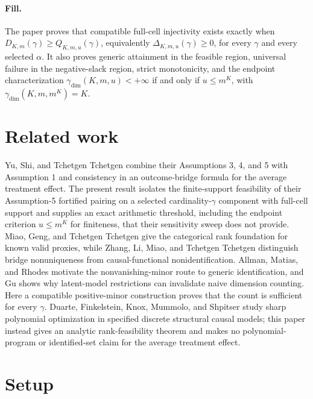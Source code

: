 \documentclass{article}
\begin{document}
\paragraph{Fill.} The paper proves that compatible full-cell injectivity exists exactly when \(D_{K,m}(\gamma)\ge Q_{K,m,u}(\gamma)\), equivalently \(\Delta_{K,m,u}(\gamma)\ge0\), for every \(\gamma\) and every selected \(\alpha\). It also proves generic attainment in the feasible region, universal failure in the negative-slack region, strict monotonicity, and the endpoint characterization \(\gamma_{\mathrm{dim}}(K,m,u)<+\infty\) if and only if \(u\le m^K\), with \(\gamma_{\mathrm{dim}}(K,m,m^K)=K\).

\section{Related work}

Yu, Shi, and Tchetgen Tchetgen \cite{YuShiTchetgen2025} combine their Assumptions 3, 4, and 5 with Assumption 1 and consistency in an outcome-bridge formula for the average treatment effect. The present result isolates the finite-support feasibility of their Assumption-5 fortified pairing on a selected cardinality-\(\gamma\) component with full-cell support and supplies an exact arithmetic threshold, including the endpoint criterion \(u\le m^K\) for finiteness, that their sensitivity sweep does not provide. Miao, Geng, and Tchetgen Tchetgen \cite{MiaoGengTchetgen2018} give the categorical rank foundation for known valid proxies, while Zhang, Li, Miao, and Tchetgen Tchetgen \cite{ZhangLiMiaoTchetgen2023} distinguish bridge nonuniqueness from causal-functional nonidentification. Allman, Matias, and Rhodes \cite{AllmanMatiasRhodes2009} motivate the nonvanishing-minor route to generic identification, and Gu \cite{Gu2025BlessingDependence} shows why latent-model restrictions can invalidate naive dimension counting. Here a compatible positive-minor construction proves that the count is sufficient for every \(\gamma\). Duarte, Finkelstein, Knox, Mummolo, and Shpitser \cite{DuarteFinkelsteinKnoxMummoloShpitser2024} study sharp polynomial optimization in specified discrete structural causal models; this paper instead gives an analytic rank-feasibility theorem and makes no polynomial-program or identified-set claim for the average treatment effect.

\section{Setup}
\end{document}
